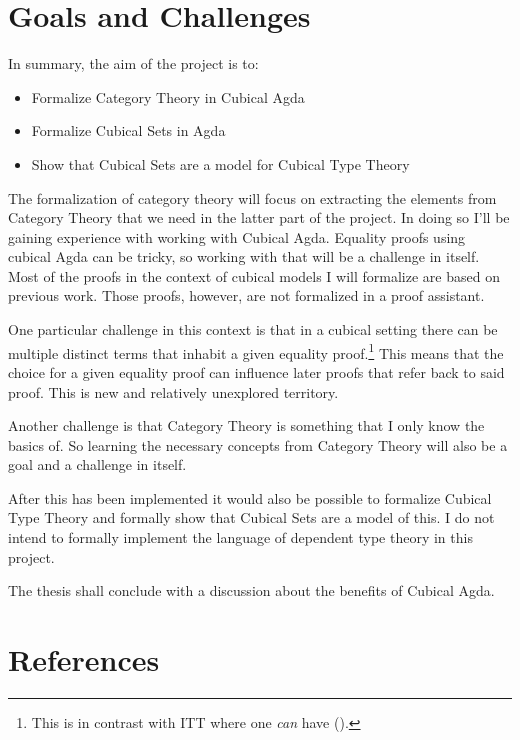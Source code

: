 \documentclass{article}
\begin{document}
\section{Goals and Challenges}
%
In summary, the aim of the project is to:
%
\begin{itemize}
\item
Formalize Category Theory in Cubical Agda
\item
Formalize Cubical Sets in Agda
\item
Show that Cubical Sets are a model for Cubical Type Theory
\end{itemize}
%
The formalization of category theory will focus on extracting the elements from
Category Theory that we need in the latter part of the project. In doing so I'll
be gaining experience with working with Cubical Agda. Equality proofs using
cubical Agda can be tricky, so working with that will be a challenge in itself.
Most of the proofs in the context of cubical models I will formalize are based
on previous work. Those proofs, however, are not formalized in a proof
assistant.

One particular challenge in this context is that in a cubical setting there can
be multiple distinct terms that inhabit a given equality proof.\footnote{This is
in contrast with ITT where one \emph{can} have 
(\cite[p. 4]{huber-2016}).} This means that the choice for a given equality
proof can influence later proofs that refer back to said proof. This is new and
relatively unexplored territory.

Another challenge is that Category Theory is something that I only know the
basics of. So learning the necessary concepts from Category Theory will also be
a goal and a challenge in itself.

After this has been implemented it would also be possible to formalize Cubical
Type Theory and formally show that Cubical Sets are a model of this. I do not
intend to formally implement the language of dependent type theory in this
project.

The thesis shall conclude with a discussion about the benefits of Cubical Agda.
%
\section{References}
%

\nocite{cubical-demo}
\nocite{coquand-2013}

\end{document}
